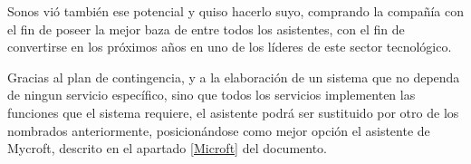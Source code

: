 \begin{enumerate}
Sonos vió también ese potencial y quiso hacerlo suyo, comprando la compañía con el fin de poseer la mejor baza de entre todos los asistentes, con el fin de convertirse en los próximos años en uno de los líderes de este sector tecnológico.

Gracias al plan de contingencia, y a la elaboración de un sistema que no dependa de ningun servicio específico, sino que todos los servicios implementen las funciones que el sistema requiere, el asistente podrá ser sustituido por otro de los nombrados anteriormente, posicionándose como mejor opción el asistente de Mycroft, descrito en el apartado \ref{Microft} del documento.


\end{enumerate}